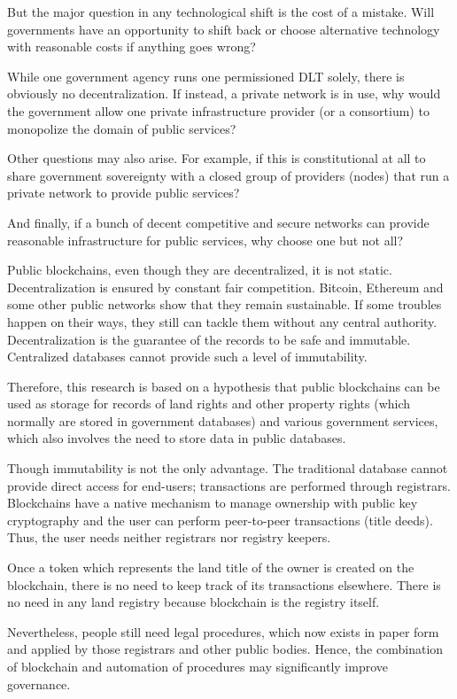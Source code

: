 \begin{multicols}{2}
But the major question in any technological shift is the cost of a mistake. Will governments have an opportunity to shift back or choose alternative technology with reasonable costs if anything goes wrong?

While one government agency runs one permissioned DLT solely, there is obviously no decentralization. If instead, a private network is in use, why would the government allow one private infrastructure provider (or a consortium) to monopolize the domain of public services?

Other questions may also arise. For example, if this is constitutional at all to share government sovereignty with a closed group of providers (nodes) that run a private network to provide public services? 

And finally, if a bunch of decent competitive and secure networks can provide reasonable infrastructure for public services, why choose one but not all?

Public blockchains, even though they are decentralized, it is not static.  Decentralization is ensured by constant fair competition. Bitcoin, Ethereum and some other public networks show that they remain sustainable. If some troubles happen on their ways, they still can tackle them without any central authority. Decentralization is the guarantee of the records to be safe and immutable. Centralized databases cannot provide such a level of immutability.

Therefore, this research is based on a hypothesis that public blockchains can be used as storage for records of land rights and other property rights (which normally are stored in government databases) and various government services, which also involves the need to store data in public databases.

Though immutability is not the only advantage. The traditional database cannot provide direct access for end-users; transactions are performed through registrars. Blockchains have a native mechanism to manage ownership with public key cryptography and the user can perform peer-to-peer transactions (title deeds). Thus, the user needs neither registrars nor registry keepers.

Once a token which represents the land title of the owner is created on the blockchain, there is no need to keep track of its transactions elsewhere. There is no need in any land registry because blockchain is the registry itself.

Nevertheless, people still need legal procedures, which now exists in paper form and applied by those registrars and other public bodies. Hence, the combination of blockchain and automation of procedures may significantly improve governance.


\end{multicols}
